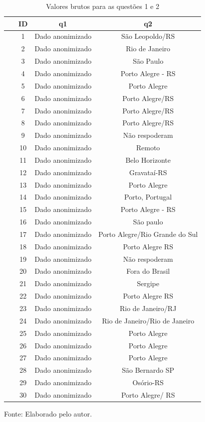 \documentclass[twoside,english,brazilian]{UNISINOSartigo}
\newcommand{\source}[1]{\caption*{Fonte: {#1}} }
\begin{document}
\begin{table}[h]
\footnotesize
    \caption{Valores brutos para as questões 1 e 2}
    \begin{tabularx}{\columnwidth}{cccc}
    \hline
 ~ & ID & q1 & q2 \\ \hline
 ~ & 1 & Dado anonimizado & São Leopoldo/RS \\
 ~ & 2 & Dado anonimizado & Rio de Janeiro \\
 ~ & 3 & Dado anonimizado & São Paulo  \\
 ~ & 4 & Dado anonimizado & Porto Alegre - RS \\
 ~ & 5 & Dado anonimizado & Porto Alegre  \\
 ~ & 6 & Dado anonimizado & Porto Alegre/RS \\
 ~ & 7 & Dado anonimizado & Porto Alegre/RS \\
 ~ & 8 & Dado anonimizado & Porto Alegre/RS \\
 ~ & 9 & Dado anonimizado & Não respoderam \\
 ~ & 10 & Dado anonimizado  & Remoto  \\
 ~ & 11 & Dado anonimizado & Belo Horizonte \\
 ~ & 12 & Dado anonimizado & Gravataí-RS \\
 ~ & 13 & Dado anonimizado & Porto Alegre \\
 ~ & 14 & Dado anonimizado & Porto, Portugal \\
 ~ & 15 & Dado anonimizado & Porto Alegre - RS \\
 ~ & 16 & Dado anonimizado & São paulo \\
 ~ & 17 & Dado anonimizado & Porto Alegre/Rio Grande do Sul \\
 ~ & 18 & Dado anonimizado & Porto Alegre RS \\
 ~ & 19 & Dado anonimizado & Não respoderam \\
 ~ & 20 & Dado anonimizado & Fora do Brasil \\
 ~ & 21 & Dado anonimizado & Sergipe \\
 ~ & 22 & Dado anonimizado  & Porto Alegre RS \\
 ~ & 23 & Dado anonimizado & Rio de Janeiro/RJ \\
 ~ & 24 & Dado anonimizado & Rio de Janeiro/Rio de Janeiro \\
 ~ & 25 & Dado anonimizado & Porto Alegre \\
 ~ & 26 & Dado anonimizado & Porto Alegre \\
 ~ & 27 & Dado anonimizado & Porto Alegre \\
 ~ & 28 & Dado anonimizado & São Bernardo SP \\
 ~ & 29 & Dado anonimizado  & Osório-RS  \\
 ~ & 30 & Dado anonimizado & Porto Alegre/ RS \\ \hline
    \end{tabularx}
    \source{Elaborado pelo autor.}
\end{table}
\end{document}
